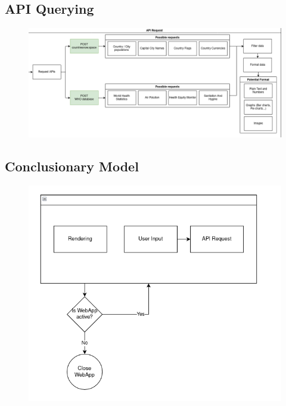 \newpage
\subsection{API Querying}
\begin{figure}[h]
\centering
\includegraphics[width=1.0\linewidth]{images/apireq}
\caption{}
\label{fig:apireq}
\end{figure}

\subsection{Conclusionary Model}
\begin{figure}[h]
\centering
\includegraphics[width=0.63\linewidth]{images/conclusionary}
\caption{}
\label{fig:conclusionary}
\end{figure}


\newpage
